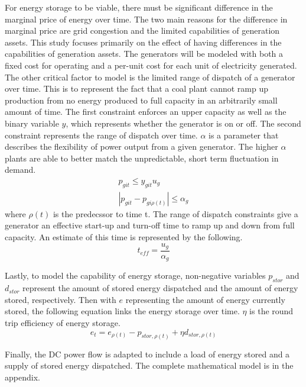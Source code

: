For energy storage to be viable, there must be significant difference in the marginal price of
energy over time. The two main reasons for the difference in marginal price are grid congestion and the
limited capabilities of generation assets. This study focuses primarily on the effect of having differences
in the capabilities of generation assets. The generators will be modeled with both a fixed cost for
operating and a per-unit cost for each unit of electricity generated. The other critical factor to model is
the limited range of dispatch of a generator over time. This is to represent the fact that a coal plant
cannot ramp up production from no energy produced to full capacity in an arbitrarily small amount of
time. The first constraint enforces an upper capacity as well as the binary variable $y$, which represents
whether the generator is on or off. The second constraint represents the range of dispatch over time.  $\alpha$ is a parameter that describes the flexibility of power output from a given generator.  The higher $\alpha$ plants are able to better match the unpredictable, short term fluctuation in demand. 
\begin{align}
	p_{git} \leq y_{git} u_g  \\
	\left|  p_{git} - p_{gi \rho (t)}  \right|  \leq  \alpha_g 
\end{align}
where $\rho (t)$ is the predecssor to time t.  The range of dispatch constraints give a generator an effective start-up and turn-off time to ramp up and down from full capacity. An estimate of this time is represented by the following. 
\begin{equation*}
	t_{eff} = \frac{u_g}{\alpha_g}
\end{equation*}

Lastly, to model the capability of energy storage, non-negative variables $p_{stor}$ and $d_{stor}$ represent the
amount of stored energy dispatched and the amount of energy stored, respectively. Then with $e$ representing the amount of energy currently stored, the following equation links the energy storage over time. $\eta$ is the round trip efficiency of energy storage.
\begin{equation}
e_{t} = e_{\rho (t)} - p_{stor, \rho (t)} + \eta d_{stor, \rho (t)}
\end{equation} 

Finally, the DC power flow is adapted to include a load of energy stored and a supply
of stored energy dispatched. The complete mathematical model is in the appendix.

